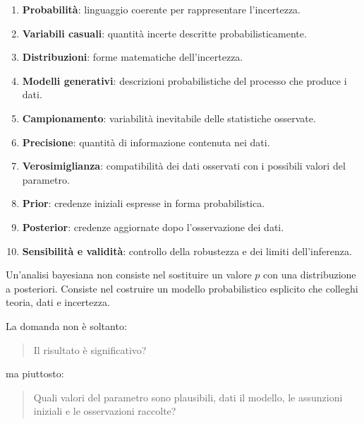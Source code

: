\documentclass[
  italian,
  letterpaper,
  a4paper,
  11pt,
  open=any]{scrbook}
\providecommand{\tightlist}{%
  \setlength{\itemsep}{0pt}\setlength{\parskip}{0pt}}
\theoremstyle{plain}
\theoremstyle{definition}
\theoremstyle{definition}
\theoremstyle{remark}
\begin{document}
\begin{enumerate}
\def\labelenumi{\arabic{enumi}.}
\tightlist
\item
  \textbf{Probabilità}: linguaggio coerente per rappresentare
  l'incertezza.
\item
  \textbf{Variabili casuali}: quantità incerte descritte
  probabilisticamente.
\item
  \textbf{Distribuzioni}: forme matematiche dell'incertezza.
\item
  \textbf{Modelli generativi}: descrizioni probabilistiche del processo
  che produce i dati.
\item
  \textbf{Campionamento}: variabilità inevitabile delle statistiche
  osservate.
\item
  \textbf{Precisione}: quantità di informazione contenuta nei dati.
\item
  \textbf{Verosimiglianza}: compatibilità dei dati osservati con i
  possibili valori del parametro.
\item
  \textbf{Prior}: credenze iniziali espresse in forma probabilistica.
\item
  \textbf{Posterior}: credenze aggiornate dopo l'osservazione dei dati.
\item
  \textbf{Sensibilità e validità}: controllo della robustezza e dei
  limiti dell'inferenza.
\end{enumerate}

\begin{tcolorbox}[enhanced jigsaw, arc=.35mm, bottomrule=.15mm, bottomtitle=1mm, breakable, colback=white, colbacktitle=quarto-callout-important-color!10!white, colframe=quarto-callout-important-color-frame, coltitle=black, left=2mm, leftrule=.75mm, opacityback=0, opacitybacktitle=0.6, rightrule=.15mm, title=\textcolor{quarto-callout-important-color}{\faExclamation}\hspace{0.5em}{L'idea da portare con sé}, titlerule=0mm, toprule=.15mm, toptitle=1mm]

Un'analisi bayesiana non consiste nel sostituire un valore \(p\) con una
distribuzione a posteriori. Consiste nel costruire un modello
probabilistico esplicito che colleghi teoria, dati e incertezza.

La domanda non è soltanto:

\begin{quote}
Il risultato è significativo?
\end{quote}

ma piuttosto:

\begin{quote}
Quali valori del parametro sono plausibili, dati il modello, le
assunzioni iniziali e le osservazioni raccolte?
\end{quote}

\end{tcolorbox}
\end{document}
